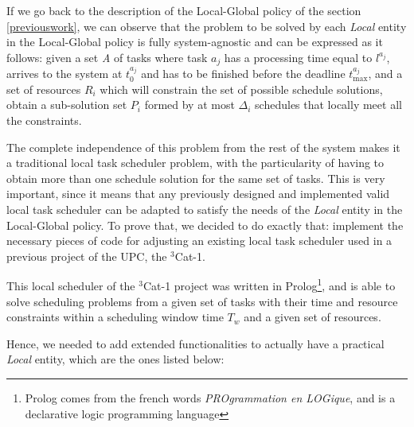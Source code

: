 If we go back to the description of the Local-Global policy of the section \ref{previouswork}, we can observe that the problem to be solved by each \emph{Local} entity in the Local-Global policy is fully system-agnostic and can be expressed as it follows: given a set \emph{A} of tasks where task $a_j$ has a processing time equal to $l^{a_{j}}$, arrives to the system at $t_0^{a_j}$ and has to be finished before the deadline $t_{\text{max}}^{a_j}$, and a set of resources $R_i$ which will constrain the set of possible schedule solutions, obtain a sub-solution set $P_{i}$ formed by at most $\Delta_i$ schedules that locally meet all the constraints.

The complete independence of this problem from the rest of the system makes it a traditional local task scheduler problem, with the particularity of having to obtain more than one schedule solution for the same set of tasks. This is very important, since it means that any previously designed and implemented valid local task scheduler can be adapted to satisfy the needs of the \emph{Local} entity in the Local-Global policy. To prove that, we decided to do exactly that: implement the necessary pieces of code for adjusting an existing local task scheduler used in a previous project of the UPC, the $^3$Cat-1.

This local scheduler of the $^3$Cat-1 project was written in Prolog\footnote{Prolog comes from the french words \textit{PROgrammation en LOGique}, and is a declarative logic programming language}, and is able to solve scheduling problems from a given set of tasks with their time and resource constraints within a scheduling window time $T_w$ and a given set of resources.

Hence, we needed to add extended functionalities to actually have a practical \emph{Local} entity, which are the ones listed below:

